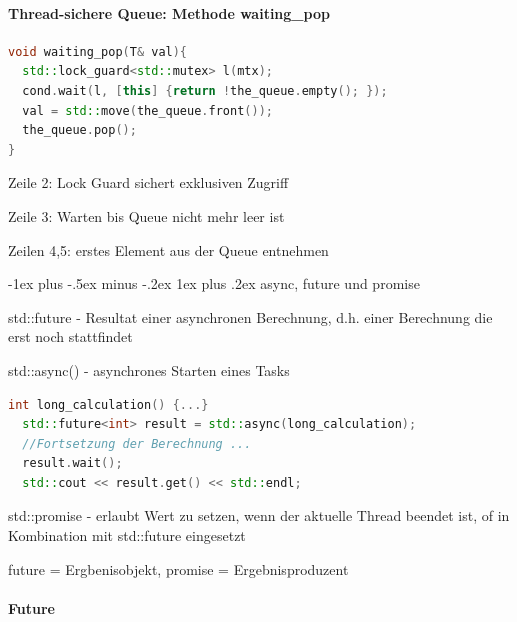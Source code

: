 \documentclass[10pt]{article}
\makeatletter
\renewcommand{\subsubsection}{\@startsection{subsubsection}{3}{0mm}%
                                {-1ex plus -.5ex minus -.2ex}%
                                {1ex plus .2ex}%
                                {\normalfont\small\bfseries}}
\makeatother
\begin{document}
  \paragraph{Thread-sichere Queue: Methode waiting\_pop}
  \begin{lstlisting}[language=C++]
void waiting_pop(T& val){
  std::lock_guard<std::mutex> l(mtx);
  cond.wait(l, [this] {return !the_queue.empty(); });
  val = std::move(the_queue.front());
  the_queue.pop();
}
\end{lstlisting}
  \begin{itemize*}
    \item Zeile 2: Lock Guard sichert exklusiven Zugriff
    \item Zeile 3: Warten bis Queue nicht mehr leer ist
    \item Zeilen 4,5: erstes Element aus der Queue entnehmen
  \end{itemize*}
  
  \subsubsection{async, future und promise}
  \begin{itemize*}
    \item std::future - Resultat einer asynchronen Berechnung, d.h. einer Berechnung die erst noch stattfindet
    \item std::async() - asynchrones Starten eines Tasks
    \begin{lstlisting}[language=C++]
  int long_calculation() {...}
  std::future<int> result = std::async(long_calculation);
  //Fortsetzung der Berechnung ...
  result.wait();
  std::cout << result.get() << std::endl;
  \end{lstlisting}
    \item std::promise - erlaubt Wert zu setzen, wenn der aktuelle Thread beendet ist, of in Kombination mit std::future eingesetzt
    \item future = Ergbenisobjekt, promise = Ergebnisproduzent
  \end{itemize*}
  
  \paragraph{Future}
  
\end{document}
